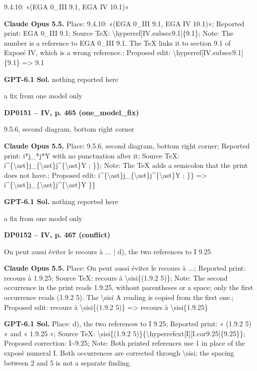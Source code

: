 9.4.10: «(EGA 0\_III 9.1, EGA IV 10.1)»\par
\textbf{Claude Opus 5.5.} Place: 9.4.10: «(EGA 0\_III 9.1, EGA IV 10.1)»; Reported print: EGA 0\_III 9.1; Source TeX: \textbackslash{}hyperref[IV.subsec9.1]\{9.1\}; Note: The number is a reference to EGA 0\_III 9.1. The TeX links it to section 9.1 of Exposé IV, which is a wrong reference.; Proposed edit: \textbackslash{}hyperref[IV.subsec9.1]\{9.1\} =\allowbreak > 9.1\par
\textbf{GPT-6.1 Sol.} nothing reported here\par
a fix from one model only\par
\par\noindent\hypertarget{DP0151}{}\textbf{DP0151 -- IV, p. 465 (one\_model\_fix)}\par
9.5.6, second diagram, bottom right corner\par
\textbf{Claude Opus 5.5.} Place: 9.5.6, second diagram, bottom right corner; Reported print: i*j\_*j*Y with no punctuation after it; Source TeX: i\textasciicircum{}\{\textbackslash{}ast\}j\_\{\textbackslash{}ast\}j\textasciicircum{}\{\textbackslash{}ast\}Y ; \}\}; Note: The TeX adds a semicolon that the print does not have.; Proposed edit: i\textasciicircum{}\{\textbackslash{}ast\}j\_\{\textbackslash{}ast\}j\textasciicircum{}\{\textbackslash{}ast\}Y ; \}\} =\allowbreak > i\textasciicircum{}\{\textbackslash{}ast\}j\_\{\textbackslash{}ast\}j\textasciicircum{}\{\textbackslash{}ast\}Y \}\}\par
\textbf{GPT-6.1 Sol.} nothing reported here\par
a fix from one model only\par
\par\noindent\hypertarget{DP0152}{}\textbf{DP0152 -- IV, p. 467 (conflict)}\par
On peut aussi éviter le recours à ... | d), the two references to I 9.25\par
\textbf{Claude Opus 5.5.} Place: On peut aussi éviter le recours à ...; Reported print: recours à 1.9.25; Source TeX: recours à \textbackslash{}sisi\{(1.9.2 5)\}; Note: The second occurrence in the print reads 1.9.25, without parentheses or a space; only the first occurrence reads (1.9.2 5). The \textbackslash{}sisi A reading is copied from the first one.; Proposed edit: recours à \textbackslash{}sisi\{(1.9.2 5)\} =\allowbreak > recours à \textbackslash{}sisi\{1.9.25\}\par
\textbf{GPT-6.1 Sol.} Place: d), the two references to I 9.25; Reported print: « (1.9.2 5) » and « 1.9.25 »; Source TeX: \textbackslash{}sisi\{(1.9.2 5)\}\{\textbackslash{}hyperrefext[I][I.cor9.25]\{9.25\}\}; Proposed correction: I\textasciitilde{}9.25; Note: Both printed references use 1 in place of the exposé numeral I. Both occurrences are corrected through \textbackslash{}sisi; the spacing between 2 and 5 is not a separate finding.\par
